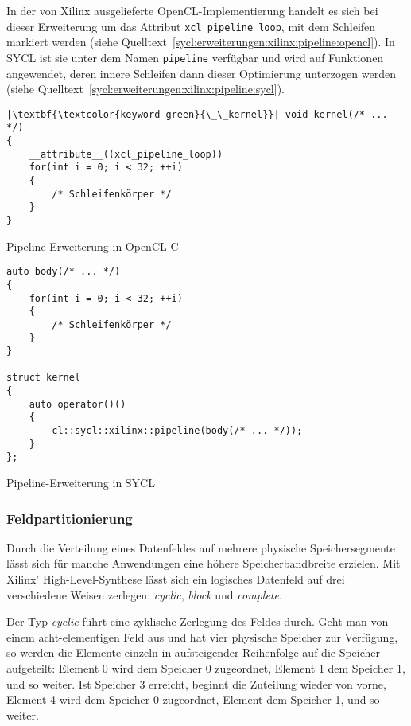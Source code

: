 In der von Xilinx ausgelieferte OpenCL-Implementierung handelt es sich bei
dieser Erweiterung um das Attribut \texttt{xcl\_pipeline\_loop}, mit dem
Schleifen markiert werden (siehe
Quelltext~\ref{sycl:erweiterungen:xilinx:pipeline:opencl}). In SYCL ist sie
unter dem Namen \texttt{pipeline} verfügbar und wird auf Funktionen angewendet,
deren innere Schleifen dann dieser Optimierung unterzogen werden (siehe
Quelltext~\ref{sycl:erweiterungen:xilinx:pipeline:sycl}).

\begin{code}
    \begin{verbatim}
|\textbf{\textcolor{keyword-green}{\_\_kernel}}| void kernel(/* ... */)
{
    __attribute__((xcl_pipeline_loop))
    for(int i = 0; i < 32; ++i)
    {
        /* Schleifenkörper */
    }
}
    \end{verbatim}
    \caption{Pipeline-Erweiterung in OpenCL C}
    \label{sycl:erweiterungen:xilinx:pipeline:opencl}
\end{code}

\begin{code}
    \begin{verbatim}
auto body(/* ... */)
{
    for(int i = 0; i < 32; ++i)
    {
        /* Schleifenkörper */
    }
}

struct kernel
{
    auto operator()()
    {
        cl::sycl::xilinx::pipeline(body(/* ... */));
    }
};
    \end{verbatim}
    \caption{Pipeline-Erweiterung in SYCL}
    \label{sycl:erweiterungen:xilinx:pipeline:sycl}
\end{code}

\subsubsection{Feldpartitionierung}
\label{sycl:erweiterungen:xilinx:partitioning}

Durch die Verteilung eines Datenfeldes auf mehrere physische Speichersegmente
lässt sich für manche Anwendungen eine höhere Speicherbandbreite erzielen.
Mit Xilinx' High-Level-Synthese lässt sich ein logisches Datenfeld auf drei
verschiedene Weisen zerlegen: \textit{cyclic}, \textit{block} und
\textit{complete}. \cite[vgl.][16]{sdxpragma2019}

Der Typ \textit{cyclic} führt eine zyklische Zerlegung des Feldes durch. Geht
man von einem acht-elementigen Feld aus und hat vier physische Speicher zur
Verfügung, so werden die Elemente einzeln in aufsteigender Reihenfolge auf die
Speicher aufgeteilt: Element 0 wird dem Speicher 0 zugeordnet, Element 1 dem
Speicher 1, und so weiter. Ist Speicher 3 erreicht, beginnt die Zuteilung wieder
von vorne, Element 4 wird dem Speicher 0 zugeordnet, Element dem Speicher 1,
und so weiter. \cite[vgl.][17]{sdxpragma2019}

